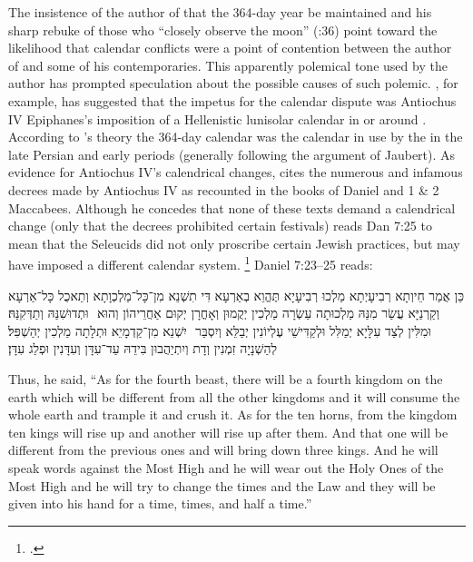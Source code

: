 The insistence of the author of \jub that the 364-day year be maintained and his sharp rebuke of those who ``closely observe the moon'' (:36) point toward the likelihood that calendar conflicts were a point of contention between the author of \jub and some of his contemporaries.%
    \autocite{fraade_dine-israel2010}
This apparently polemical tone used by the author has prompted speculation about the possible causes of such polemic. \vanderkam, for example, has suggested that the impetus for the calendar dispute was Antiochus IV Epiphanes's imposition of a Hellenistic lunisolar calendar in or around . According to \vanderkam's theory the 364-day calendar was the calendar in use by the \jerusalemtemple in the late Persian and early \secondtemple periods (generally following the argument of Jaubert). As evidence for Antiochus IV's calendrical changes, \vanderkam cites the numerous and infamous decrees made by Antiochus IV as recounted in the books of Daniel and 1 \& 2 Maccabees. Although he concedes that none of these texts demand a calendrical change (only that the decrees prohibited certain festivals) \vanderkam reads Dan 7:25 to mean that the Seleucids did not only proscribe certain Jewish practices, but may have imposed a different calendar system.%
    \footnote{%
        \Cite[59--60; 68--69]{vanderkam_jsj1981}.}
Daniel 7:23--25 reads:

\begin{aramaictext}
    ‏כֵּן אֲמַר חֵיוְתָא רְבִיעָיְתָא מַלְכוּ רְבִיעָיָא תֶּהֱוֵא בְאַרְעָא דִּי תִשְׁנֵא מִן־כָּל־מַלְכְוָתָא וְתֵאכֻל כָּל־אַרְעָא וּתְדוּשִׁנַּהּ וְתַדְּקִנַּהּ׃ ‎
    ‏ וְקַרְנַיָּא עֲשַׂר מִנַּהּ מַלְכוּתָה עַשְׂרָה מַלְכִין יְקֻמוּן וְאָחֳרָן יְקוּם אַחֲרֵיהוֹן וְהוּא יִשְׁנֵא מִן־קַדְמָיֵא וּתְלָתָה מַלְכִין יְהַשְׁפִּל׃ ‎
    ‏ וּמִלִּין לְצַד עִלָּיָא יְמַלִּל וּלְקַדִּישֵׁי עֶלְיוֹנִין יְבַלֵּא וְיִסְבַּר לְהַשְׁנָיָה זִמְנִין וְדָת וְיִתְיַהֲבוּן בִּידֵהּ עַד־עִדָּן וְעִדָּנִין וּפְלַג עִדָּן׃
\end{aramaictext}

\begin{translation}
    Thus, he said, ``As for the fourth beast, there will be a fourth kingdom on the earth which will be different from all the other kingdoms and it will consume the whole earth and trample it and crush it.
    As for the ten horns, from the kingdom ten kings will rise up and another will rise up after them. And that one will be different from the previous ones and will bring down three kings.
    And he will speak words against the Most High and he will wear out the Holy Ones of the Most High and he will try to change the times and the Law and they will be given into his hand for a time, times, and half a time.''
\end{translation}

